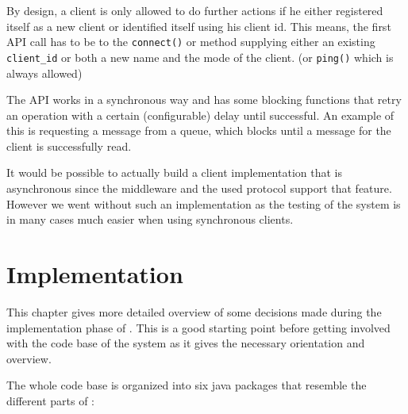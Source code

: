 \documentclass[a4paper, oneside]{csthesis}
\begin{document}
    By design, a client is only allowed to do further actions if he either
    registered itself as a new client or identified itself using his client id.
    This means, the first API call has to be to the {\tt connect()} or method
    supplying either an existing {\tt client\_id} or both a new name and the
    mode of the client. (or {\tt ping()} which is always allowed)
    
    The API works in a synchronous way and has some blocking functions that
    retry an operation with a certain (configurable) delay until successful. An
    example of this is requesting a message from a queue, which blocks until a
    message for the client is successfully read.
    
    It would be possible to actually build a client implementation that is
    asynchronous since the middleware and the used protocol support that
    feature. However we went without such an implementation as the testing of
    the system is in many cases much easier when using synchronous clients.
    

\chapter{Implementation}
\label{ch:implementation}
This chapter gives more detailed overview of some decisions made during the
implementation phase of \telesto. This is a good starting point before getting
involved with the code base of the system as it gives the necessary orientation
and overview.

The whole code base is organized into six java packages that resemble the
different parts of \telesto:
\end{document}
